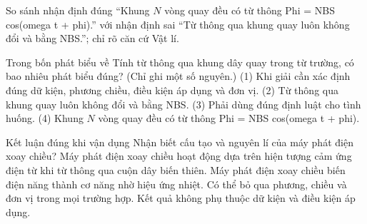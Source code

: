 \begin{bt}
So sánh nhận định đúng “Khung $N$ vòng quay đều có từ thông Phi = NBS cos(omega t + phi).” với nhận định sai “Từ thông qua khung quay luôn không đổi và bằng NBS.”; chỉ rõ căn cứ Vật lí.
\end{bt}

\begin{ex}
Trong bốn phát biểu về Tính từ thông qua khung dây quay trong từ trường, có bao nhiêu phát biểu đúng? (Chỉ ghi một số nguyên.) (1) Khi giải cần xác định đúng dữ kiện, phương chiều, điều kiện áp dụng và đơn vị. (2) Từ thông qua khung quay luôn không đổi và bằng NBS. (3) Phải dùng đúng định luật cho tình huống. (4) Khung $N$ vòng quay đều có từ thông Phi = NBS cos(omega t + phi).
\end{ex}

\begin{ex}
Kết luận đúng khi vận dụng Nhận biết cấu tạo và nguyên lí của máy phát điện xoay chiều?
\choice
{\True Máy phát điện xoay chiều hoạt động dựa trên hiện tượng cảm ứng điện từ khi từ thông qua cuộn dây biến thiên.}
{Máy phát điện xoay chiều biến điện năng thành cơ năng nhờ hiệu ứng nhiệt.}
{Có thể bỏ qua phương, chiều và đơn vị trong mọi trường hợp.}
{Kết quả không phụ thuộc dữ kiện và điều kiện áp dụng.}
\end{ex}

